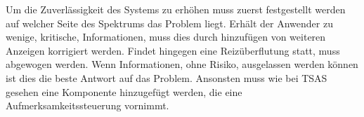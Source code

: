 \documentclass{llncs}					%
\begin{document}
Um die Zuverlässigkeit des Systems zu erhöhen muss zuerst festgestellt werden auf welcher Seite des Spektrums das Problem liegt. Erhält der Anwender zu wenige, kritische, Informationen, muss dies durch hinzufügen von weiteren Anzeigen korrigiert werden.
Findet hingegen eine Reizüberflutung statt, muss abgewogen werden. Wenn Informationen, ohne Risiko, ausgelassen werden können ist dies die beste Antwort auf das Problem. Ansonsten muss wie bei TSAS gesehen eine Komponente hinzugefügt werden, die eine Aufmerksamkeitssteuerung vornimmt.


\newpage
\end{document}
